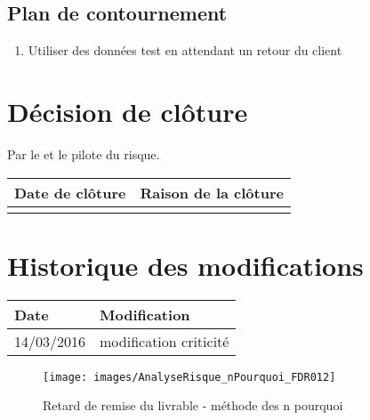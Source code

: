 \flushleft
\subsection*{Plan de contournement}

\begin{enumerate}
	\item Utiliser des données test en attendant un retour du client
\end{enumerate}

\section*{Décision de clôture}
Par le \CP{} et le pilote du risque.
\begin{table}[H]
\centering
	\begin{tabularx}{16.8cm}{|X|X|}
	\hline
	\rowcolor{gray!40} Date de clôture & Raison de la clôture \\
	\hline
	  & \\
	\hline
	\end{tabularx}
\end{table}

\section*{Historique des modifications}
\begin{table}[H]
\centering
	\begin{tabularx}{16.8cm}{|X|X|}
	\hline
	\rowcolor{gray!40} Date & Modification \\
	\hline
	 14/03/2016 & modification criticité\\
	\hline
	\end{tabularx}
\end{table}
\newpage

\begin{figure}
	\centering
	\texttt{[image: images/AnalyseRisque\_nPourquoi\_FDR012]}
	\caption{\label{risque retard de remise du livrable} Retard de remise du livrable - méthode des n pourquoi}
\end{figure}
